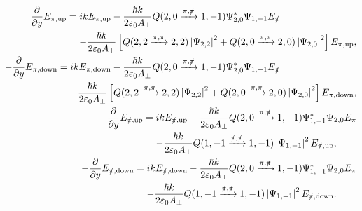 \begin{subequations}
    \begin{align}
        \begin{split}
            \frac{\partial}{\partial y}E_{\pi, \text{up}} &= i k E_{\pi, \text{up}} - \frac{\hbar k}{2 \varepsilon_0 A_\perp} Q({2, 0 \xrightarrow{\pi,\pislash} 1, -1}) \Psi_{2, 0}^* \Psi_{1, -1} E_{\pislash}\\
            &\relphantom{=} - \frac{\hbar k}{2 \varepsilon_0 A_\perp} \left[Q({2, 2 \xrightarrow{\pi,\pi} 2, 2}) \abs{\Psi_{2, 2}}^2  + Q({2, 0 \xrightarrow{\pi,\pi} 2, 0}) \abs{\Psi_{2, 0}}^2 \right] E_{\pi, \text{up}},
        \end{split}\\
        \begin{split}
            -\frac{\partial}{\partial y}E_{\pi, \text{down}} &= i k E_{\pi, \text{down}} - \frac{\hbar k}{2 \varepsilon_0 A_\perp} Q({2, 0 \xrightarrow{\pi,\pislash} 1, -1}) \Psi_{2, 0}^* \Psi_{1, -1} E_{\pislash}\\
            &\relphantom{=} - \frac{\hbar k}{2 \varepsilon_0 A_\perp} \left[Q({2, 2 \xrightarrow{\pi,\pi} 2, 2}) \abs{\Psi_{2, 2}}^2  + Q({2, 0 \xrightarrow{\pi,\pi} 2, 0}) \abs{\Psi_{2, 0}}^2 \right] E_{\pi, \text{down}},
        \end{split}\\
        \begin{split}
            \frac{\partial}{\partial y}E_{\pislash, \text{up}} &= i k E_{\pislash, \text{up}} - \frac{\hbar k}{2 \varepsilon_0 A_\perp} Q({2, 0 \xrightarrow{\pi,\pislash} 1, -1}) \Psi_{1, -1}^* \Psi_{2, 0} E_{\pi} \\
            &\relphantom{=} - \frac{\hbar k}{2 \varepsilon_0 A_\perp} Q({1, -1 \xrightarrow{\pislash,\pislash} 1, -1}) \abs{\Psi_{1, -1}}^2 E_{\pislash, \text{up}} ,
        \end{split}\\
        \begin{split}
            -\frac{\partial}{\partial y}E_{\pislash, \text{down}} &= i k E_{\pislash, \text{down}} - \frac{\hbar k}{2 \varepsilon_0 A_\perp} Q({2, 0 \xrightarrow{\pi,\pislash} 1, -1}) \Psi_{1, -1}^* \Psi_{2, 0} E_{\pi} \\
            &\relphantom{=} - \frac{\hbar k}{2 \varepsilon_0 A_\perp} Q({1, -1 \xrightarrow{\pislash,\pislash} 1, -1}) \abs{\Psi_{1, -1}}^2 E_{\pislash, \text{down}}.
        \end{split}
\end{align}
\end{subequations}

